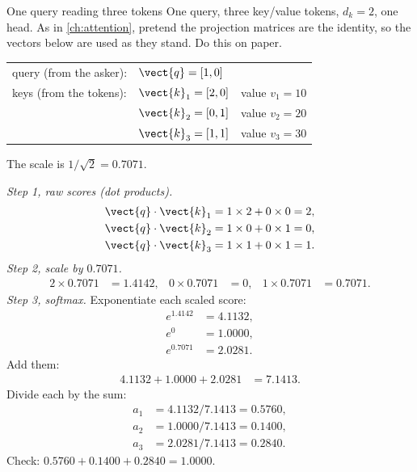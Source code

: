 \begin{worked}[label={we:ceiling:xattn}]{One query reading three tokens}
One query, three key/value tokens, $d_k = 2$, one head. As in \cref{ch:attention}, pretend the projection matrices are the identity, so the vectors below are used as they stand. Do this on paper.
\begin{center}
\begin{tabular}{lll}
query (from the asker): & $\vect{q} = [1, 0]$ & \\
keys (from the tokens): & $\vect{k}_1 = [2, 0]$ & value $v_1 = 10$\\
 & $\vect{k}_2 = [0, 1]$ & value $v_2 = 20$\\
 & $\vect{k}_3 = [1, 1]$ & value $v_3 = 30$
\end{tabular}
\end{center}
The scale is $1/\sqrt{2} = 0.7071$.

\emph{Step 1, raw scores (dot products).}
\begin{align*}
  \vect{q}\cdot\vect{k}_1 &= 1\times2 + 0\times0 = 2,\\
  \vect{q}\cdot\vect{k}_2 &= 1\times0 + 0\times1 = 0,\\
  \vect{q}\cdot\vect{k}_3 &= 1\times1 + 0\times1 = 1.
\end{align*}
\emph{Step 2, scale by $0.7071$.}
\begin{align*}
  2\times0.7071 &= 1.4142, & 0\times0.7071 &= 0, & 1\times0.7071 &= 0.7071.
\end{align*}
\emph{Step 3, softmax.} Exponentiate each scaled score:
\begin{align*}
  e^{1.4142} &= 4.1132,\\
  e^{0} &= 1.0000,\\
  e^{0.7071} &= 2.0281.
\end{align*}
Add them:
\begin{align*}
  4.1132 + 1.0000 + 2.0281 &= 7.1413 .
\end{align*}
Divide each by the sum:
\begin{align*}
  a_1 &= 4.1132 / 7.1413 = 0.5760,\\
  a_2 &= 1.0000 / 7.1413 = 0.1400,\\
  a_3 &= 2.0281 / 7.1413 = 0.2840.
\end{align*}
Check: $0.5760 + 0.1400 + 0.2840 = 1.0000$.


\end{worked}
